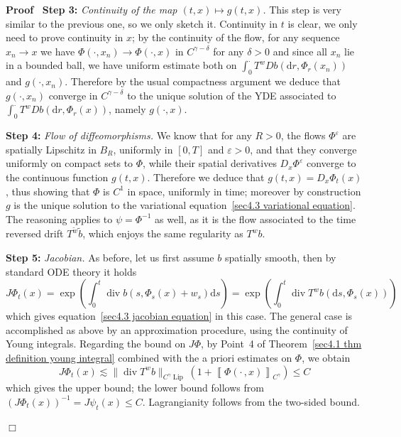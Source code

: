 \documentclass[10pt]{article}
\newcommand{\mathd}{\mathrm{d}}
\newcommand{\tmop}[1]{\ensuremath{\operatorname{#1}}}
\newcommand{\tmstrong}[1]{\textbf{#1}}
\newcommand{\tmtextit}[1]{{\itshape{#1}}}
\newenvironment{proof}{\noindent\textbf{Proof\ }}{\hspace*{\fill}$\Box$\medskip}
\begin{document}
\begin{proof}
  {\tmstrong{Step 3:}} \tmtextit{Continuity of the map $(t, x) \mapsto g (t,
  x)$.} This step is very similar to the previous one, so we only sketch it.
  Continuity in $t$ is clear, we only need to prove continuity in $x$; by the
  continuity of the flow, for any sequence $x_n \rightarrow x$ we have $\Phi
  (\cdot, x_n) \rightarrow \Phi (\cdot, x)$ in $C^{\gamma - \delta}$ for any
  $\delta > 0$ and since all $x_n$ lie in a bounded ball, we have uniform
  estimate both on $\int_0^{\cdot} T^w D b (\mathd r, \Phi_r (x_n))$ and $g
  (\cdot, x_n)$. Therefore by the usual compactness argument we deduce that $g
  (\cdot, x_n)$ converge in $C^{\gamma - \delta}$ to the unique solution of
  the YDE associated to $\int_0^{\cdot} T^w D b (\mathd r, \Phi_r (x))$,
  namely $g (\cdot, x)$.
  
  {\tmstrong{Step 4:}} \tmtextit{Flow of diffeomorphisms.} We know that for
  any $R > 0$, the flows $\Phi^{\varepsilon}$ are spatially Lipschitz in
  $B_R$, uniformly in $[0, T]$ and $\varepsilon > 0$, and that they converge
  uniformly on compact sets to $\Phi$, while their spatial derivatives $D_x
  \Phi^{\varepsilon}$ converge to the continuous function $g (t, x)$.
  Therefore we deduce that $g (t, x) = D_x \Phi_t (x)$, thus showing that
  $\Phi$ is $C^1$ in space, uniformly in time; moreover by construction $g$ is
  the unique solution to the variational equation~{\eqref{sec4.3 variational
  equation}}. The reasoning applies to $\psi = \Phi^{- 1}$ as well, as it is
  the flow associated to the time reversed drift $T^{\tilde{w}} \tilde{b}$,
  which enjoys the same regularity as $T^w b$.
  
  {\tmstrong{Step 5:}} \tmtextit{Jacobian.} As before, let us first assume $b$
  spatially smooth, then by standard ODE theory it holds
  \[ J \Phi_t (x) = \exp \left( \int_0^t \tmop{div} b (s, \Phi_s (x) + w_s)
     \mathd s \right) = \exp \left( \int_0^t \tmop{div} T^w b (\mathd s,
     \Phi_s (x)) \right) \]
  which gives equation~{\eqref{sec4.3 jacobian equation}} in this case. The
  general case is accomplished as above by an approximation procedure, using
  the continuity of Young integrals. Regarding the bound on $J \Phi$, by
  Point~4 of Theorem~\ref{sec4.1 thm definition young integral} combined with
  the a priori estimates on $\Phi$, we obtain
  \[ J \Phi_t (x) \lesssim \| \tmop{div} T^w b \|_{C^{\gamma} \tmop{Lip}}
     \left( 1 + \left\llbracket \Phi \left( \cdot \,, x \right)
     \right\rrbracket_{C^{\gamma}} \right) \leqslant C \]
  which gives the upper bound; the lower bound follows from $(J \Phi_t (x))^{-
  1} = J \psi_t (x) \leqslant C$. Lagrangianity follows from the two-sided
  bound.
  

\end{proof}
\end{document}
